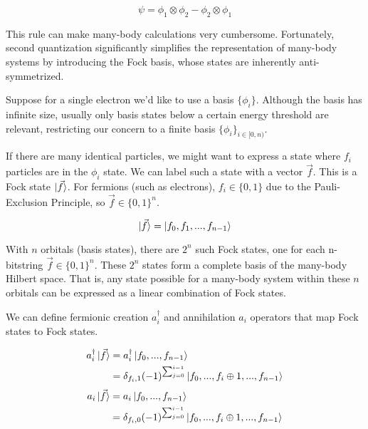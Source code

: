 \begin{equation}
    \psi = \phi_1 \otimes \phi_2 - \phi_2 \otimes \phi_1
\end{equation}

This rule can make many-body calculations very cumbersome. Fortunately, second quantization significantly simplifies the representation of many-body systems by introducing the Fock basis, whose states are inherently anti-symmetrized.

Suppose for a single electron we'd like to use a basis $\{\phi_i\}$. Although the basis has infinite size, usually only basis states below a certain energy threshold are relevant, restricting our concern to a finite basis $\{\phi_i\}_{i \in [0, n)}$.

If there are many identical particles, we might want to express a state where $f_i$ particles are in the $\phi_i$ state. We can label such a state with a vector $\vec{f}$. This is a Fock state $\ket{\vec{f}}$. For fermions (such as electrons), $f_i \in \{0, 1\}$ due to the Pauli-Exclusion Principle, so $\vec{f} \in \{0, 1\}^n$.

\begin{equation}
    \ket{\vec{f}} = \ket{f_0, f_1, ..., f_{n - 1}} \label{eq: fock}
\end{equation}

With $n$ orbitals (basis states), there are $2^n$ such Fock states, one for each n-bitstring $\vec{f} \in \{0, 1\}^n$. These $2^n$ states form a complete basis of the many-body Hilbert space. That is, any state possible for a many-body system within these $n$ orbitals can be expressed as a linear combination of Fock states.

We can define fermionic creation $a^\dag_i$ and annihilation $a_i$ operators that map Fock states to Fock states.

\begin{equation}
    \begin{split}
        a^\dag_i\ket{\vec{f}} &= a^\dag_i\ket{f_0, ..., f_{n - 1}} \\
        &= \delta_{f_i, 1}(-1)^{\sum_{j = 0}^{i - 1}}\ket{f_0, ..., f_i \oplus 1, ..., f_{n - 1}}
    \end{split}
    \label{eq: creation}
\end{equation}
\begin{equation}
    \begin{split}
        a_i\ket{\vec{f}} &= a_i\ket{f_0, ..., f_{n - 1}} \\
        &= \delta_{f_i, 0}(-1)^{\sum_{j = 0}^{i - 1}}\ket{f_0, ..., f_i \oplus 1, ..., f_{n - 1}}
    \end{split}
    \label{eq: annihilation}
\end{equation}

